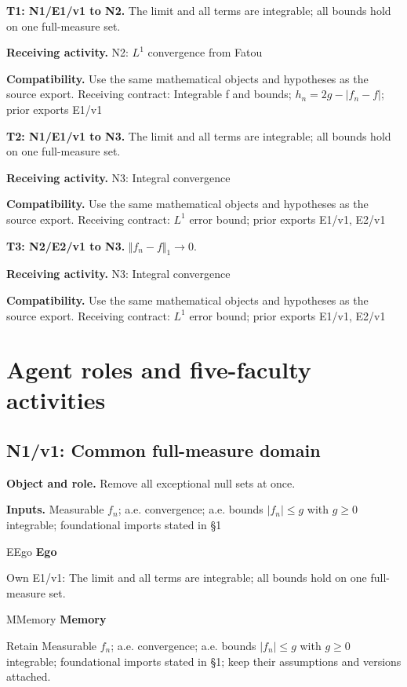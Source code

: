 \documentclass[preprint,12pt,aps,pra,showkeys,amsmath,amssymb,superscriptaddress,floatfix]{revtex4-2}
\theoremstyle{definition}
\theoremstyle{remark}
\newcommand{\mmfaculty}[3]{%
 \begin{mmfacultybox}{#1}{#2}
 {\sffamily\bfseries\color{MMBlue}#2}\par\smallskip #3
 \end{mmfacultybox}}
\newcommand{\field}[2]{\par\smallskip\noindent\textbf{#1.} #2\par}
\begin{document}
\field{T1: N1/E1/v1 to N2}{The limit and all terms are integrable; all bounds hold on one
full-measure set.}

\field{Receiving activity}{N2: \(L^{1}\) convergence from Fatou}

\field{Compatibility}{Use the same mathematical objects and hypotheses as the source export.
Receiving contract: Integrable f and bounds; \(h_n=2g-|f_n-f|\); prior
exports E1/v1}

\field{T2: N1/E1/v1 to N3}{The limit and all terms are integrable; all bounds hold on one
full-measure set.}

\field{Receiving activity}{N3: Integral convergence}

\field{Compatibility}{Use the same mathematical objects and hypotheses as the source export.
Receiving contract: \(L^{1}\) error bound; prior exports E1/v1, E2/v1}

\field{T3: N2/E2/v1 to N3}{\(\Vert f_n-f\Vert _{1}\to 0\).}

\field{Receiving activity}{N3: Integral convergence}

\field{Compatibility}{Use the same mathematical objects and hypotheses as the source export.
Receiving contract: \(L^{1}\) error bound; prior exports E1/v1, E2/v1}

\endgroup

\clearpage\section{Agent roles and five-faculty activities}\begingroup\small\linespread{1.05}\selectfont{}

\subsection{N1/v1: Common full-measure domain}

\field{Object and role}{Remove all exceptional null sets at once.}

\field{Inputs}{Measurable \(f_n\); a.e. convergence; a.e. bounds \(|f_n|\le g\) with
\(g\ge 0\) integrable; foundational imports stated in §1}

\mmfaculty{E}{Ego}{Own E1/v1: The limit and all terms are integrable; all bounds hold on
one full-measure set.}

\mmfaculty{M}{Memory}{Retain Measurable \(f_n\); a.e. convergence; a.e. bounds \(|f_n|\le g\)
with \(g\ge 0\) integrable; foundational imports stated in §1; keep
their assumptions and versions attached.}
\end{document}
